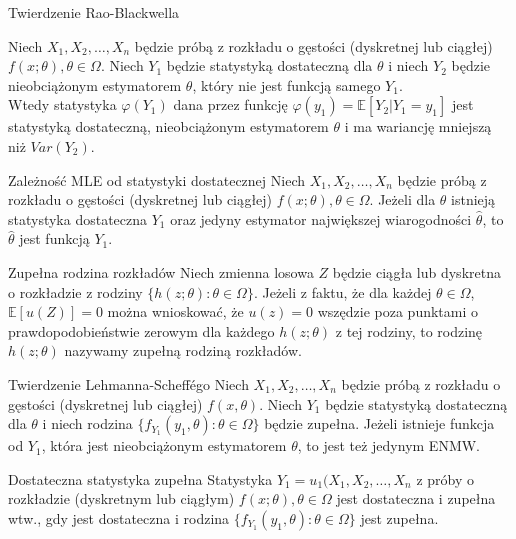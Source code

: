 \documentclass[avery5371, grid, frame]{flashcards}
\begin{document}
\begin{flashcard}[Twierdzenie]{Twierdzenie Rao-Blackwella}
    \begin{small}
    Niech $X_1, X_2, \dots, X_n$ będzie próbą z rozkładu o gęstości (dyskretnej lub ciągłej) $f(x; \theta), \theta \in \Omega$. Niech $Y_1$ będzie statystyką dostateczną dla $\theta$ i niech $Y_2$ będzie nieobciążonym estymatorem $\theta$, który nie jest funkcją samego $Y_1$.\\
    Wtedy statystyka $\varphi(Y_1)$ dana przez funkcję $\varphi(y_1) = \mathbb{E}[Y_2 |Y_1 = y_1]$ jest statystyką dostateczną, nieobciążonym estymatorem $\theta$ i ma wariancję mniejszą niż $Var(Y_2)$.
    \end{small}
\end{flashcard}

\begin{flashcard}[Twierdzenie]{Zależność MLE od statystyki dostatecznej}
    Niech $X_1, X_2, \dots, X_n$ będzie próbą z rozkładu o gęstości (dyskretnej lub ciągłej) $f(x; \theta), \theta \in \Omega$. Jeżeli dla $\theta$ istnieją statystyka dostateczna $Y_1$ oraz jedyny estymator największej wiarogodności $\hat{\theta}$, to $\hat{\theta}$ jest funkcją $Y_1$.
\end{flashcard}

\begin{flashcard}[Definicja]{Zupełna rodzina rozkładów}
    Niech zmienna losowa $Z$ będzie ciągła lub dyskretna o rozkładzie z rodziny $\{h(z; \theta) : \theta \in \Omega\}$. Jeżeli z faktu, że dla każdej $\theta \in \Omega $, $\mathbb{E}[u(Z)] = 0$ można wnioskować, że $u(z) = 0$ wszędzie poza punktami o prawdopodobieństwie zerowym dla każdego $h(z; \theta)$ z tej rodziny, to rodzinę $h(z; \theta)$ nazywamy zupełną rodziną rozkładów.
\end{flashcard}

\begin{flashcard}[Twierdzenie]{Twierdzenie Lehmanna-Scheff\'ego}
    Niech $X_1, X_2, \dots, X_n$ będzie próbą z rozkładu o gęstości (dyskretnej lub ciągłej) $f(x, \theta)$. Niech $Y_1$ będzie statystyką dostateczną dla $\theta$ i niech rodzina $\{ f_{Y_1}(y_1, \theta) : \theta \in \Omega \}$ będzie zupełna. Jeżeli istnieje funkcja od $Y_1$, która jest nieobciążonym estymatorem $\theta$, to jest też jedynym ENMW.
\end{flashcard}

\begin{flashcard}[Definicja]{Dostateczna statystyka zupełna}
    Statystyka $Y_1 = u_1(X_1, X_2, \dots, X_n$ z próby o rozkładzie (dyskretnym lub ciągłym) $f(x; \theta), \theta \in \Omega$ jest dostateczna i zupełna wtw., gdy jest dostateczna i rodzina $\{ f_{Y_1}(y_1, \theta) : \theta \in \Omega \}$ jest zupełna.
\end{flashcard}
\end{document}
